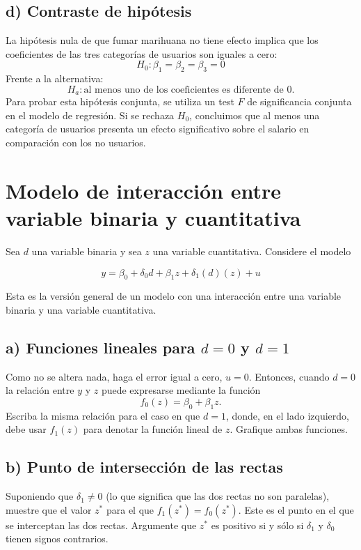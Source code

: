 \documentclass[12pt]{article}
\begin{document}
\subsection*{d) Contraste de hipótesis}
    La hipótesis nula de que fumar marihuana no tiene efecto implica que los coeficientes de las tres categorías de usuarios son iguales a cero:
    \[
    H_0: \beta_1 = \beta_2 = \beta_3 = 0
    \]
    Frente a la alternativa:
    \[
    H_a: \text{al menos uno de los coeficientes es diferente de 0.}
    \]
    Para probar esta hipótesis conjunta, se utiliza un test $F$ de significancia conjunta en el modelo de regresión.  
    Si se rechaza $H_0$, concluimos que al menos una categoría de usuarios presenta un efecto significativo sobre el salario en comparación con los no usuarios.

\section{Modelo de interacción entre variable binaria y cuantitativa}

Sea $d$ una variable binaria y sea $z$ una variable cuantitativa. Considere el modelo

\[
y = \beta_{0} + \delta_{0}d + \beta_{1}z + \delta_{1}(d)(z) + u
\]

Esta es la versión general de un modelo con una interacción entre una variable binaria y una variable cuantitativa.

\subsection*{a) Funciones lineales para $d=0$ y $d=1$}
Como no se altera nada, haga el error igual a cero, $u = 0$. Entonces, cuando $d = 0$ la relación entre $y$ y $z$ puede expresarse mediante la función
\[
f_{0}(z) = \beta_{0} + \beta_{1}z.
\]
Escriba la misma relación para el caso en que $d = 1$, donde, en el lado izquierdo, debe usar $f_{1}(z)$ para denotar la función lineal de $z$. Grafique ambas funciones.

\subsection*{b) Punto de intersección de las rectas}
Suponiendo que $\delta_{1} \neq 0$ (lo que significa que las dos rectas no son paralelas), muestre que el valor $z^{*}$ para el que $f_{1}(z^{*}) = f_{0}(z^{*})$. Este es el punto en el que se interceptan las dos rectas. Argumente que $z^{*}$ es positivo si y sólo si $\delta_{1}$ y $\delta_{0}$ tienen signos contrarios.
\end{document}
